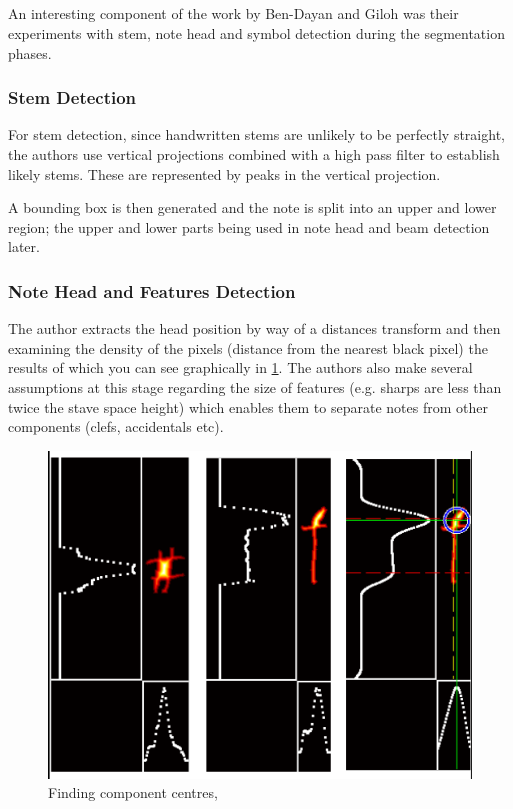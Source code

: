 \subsection{\cite{benoptical}}

An interesting component of the work by Ben-Dayan and Giloh was their experiments with stem, note head and symbol detection during the segmentation phases.

\subsubsection{Stem Detection}

For stem detection, since handwritten stems are unlikely to be perfectly straight, the authors use vertical projections combined with a high pass filter to establish likely stems. These are represented by peaks in the vertical projection.

A bounding box is then generated and the note is split into an upper and lower region; the upper and lower parts being used in note head and beam detection later.

\subsubsection{Note Head and Features Detection}

The author extracts the head position by way of a distances transform and then examining the density of the pixels (distance from the nearest black pixel) the results of which you can see graphically in \cref{fig:giloh-component-centre}. The authors also make several assumptions at this stage regarding the size of features (e.g. sharps are less than twice the stave space height) which enables them to separate notes from other components (clefs, accidentals etc).

\begin{figure}[H]
  \centering
  \includegraphics{gfx/prior-research/giloh-component-centre}
  \caption{Finding component centres, \parencite{benoptical}}
  \label{fig:giloh-component-centre}
\end{figure}
